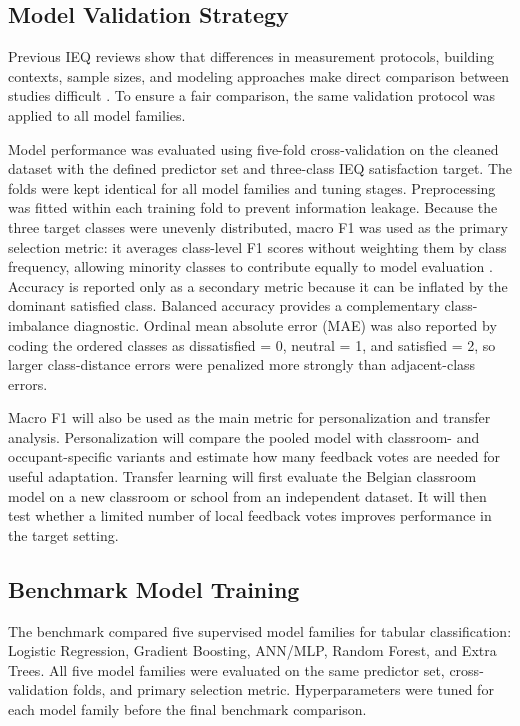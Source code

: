 ﻿\documentclass[11pt]{article}
\newcommand{\Reviewed}[1]{\begingroup\color{black}#1\endgroup}
\begin{document}
\Reviewed{

\subsection{Model Validation Strategy}

Previous IEQ reviews show that differences in measurement protocols, building contexts, sample sizes, and modeling approaches make direct comparison between studies difficult \cite{heinzerling2013,zhao2023,roumi2022}. To ensure a fair comparison, the same validation protocol was applied to all model families.

Model performance was evaluated using five-fold cross-validation on the cleaned dataset with the defined predictor set and three-class IEQ satisfaction target. The folds were kept identical for all model families and tuning stages. Preprocessing was fitted within each training fold to prevent information leakage. Because the three target classes were unevenly distributed, macro F1 was used as the primary selection metric: it averages class-level F1 scores without weighting them by class frequency, allowing minority classes to contribute equally to model evaluation \cite{sokolova2009performance}. Accuracy is reported only as a secondary metric because it can be inflated by the dominant satisfied class. Balanced accuracy provides a complementary class-imbalance diagnostic. Ordinal mean absolute error (MAE) was also reported by coding the ordered classes as dissatisfied = 0, neutral = 1, and satisfied = 2, so larger class-distance errors were penalized more strongly than adjacent-class errors.

Macro F1 will also be used as the main metric for personalization and transfer analysis. Personalization will compare the pooled model with classroom- and occupant-specific variants and estimate how many feedback votes are needed for useful adaptation. Transfer learning will first evaluate the Belgian classroom model on a new classroom or school from an independent dataset. It will then test whether a limited number of local feedback votes improves performance in the target setting.}

\Reviewed{
\subsection{Benchmark Model Training}

The benchmark compared five supervised model families for tabular classification: Logistic Regression, Gradient Boosting, ANN/MLP, Random Forest, and Extra Trees. All five model families were evaluated on the same predictor set, cross-validation folds, and primary selection metric. Hyperparameters were tuned for each model family before the final benchmark comparison.}
\end{document}
